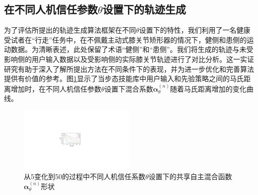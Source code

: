 \subsection{在不同人机信任参数$\theta $设置下的轨迹生成}
为了评估所提出的轨迹生成算法框架在不同$\theta $设置下的特性，我们利用了一名健康受试者在``行走''任务中，在不佩戴主动式膝关节矫形器的情况下，健侧和患侧的运动数据。为清晰表述，此处保留了术语``健侧''和``患侧''。我们将生成的轨迹与未受影响侧的用户输入数据以及受影响侧的实际膝关节轨迹进行了对比分析。这一实证研究有助于深入了解所提出方法在不同条件下的表现，并为进一步优化和完善算法提供有价值的参考。图\ref{fig:5-4}显示了当步态技能库中用户输入和先验策略之间的马氏距离增加时，在不同人机信任参数$\theta $设置下混合系数$\pmb{\alpha }_\theta ^{(n)}$随着马氏距离增加的变化曲线。
\begin{figure}[htb]
  \centering\includegraphics[width=0.5\textwidth]{figures/5-Fig-4.pdf}
  \caption{从5变化到50的过程中不同人机信任系数$\theta $设置下的共享自主混合函数$\pmb{\alpha }_\theta ^{(n)}$形状}
  \label{fig:5-4}
\end{figure}

